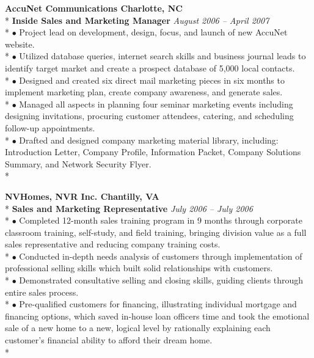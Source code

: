 \documentclass{article}
\begin{document}
\begin{samepage}
\noindent \textbf{AccuNet Communications \hfill Charlotte, NC} \\*
\textbf{Inside Sales and Marketing Manager} \hfill \textit{August 2006 -- April 2007} \\*
\noindent $\bullet$ Project lead on development, design, focus, and launch of new AccuNet website. \\*
\noindent $\bullet$ Utilized database queries, internet search skills and business journal leads to identify target market and create a prospect database of 5,000 local contacts. \\*
\noindent $\bullet$ Designed and created six direct mail marketing pieces in six months to implement marketing plan, create company awareness, and generate sales. \\*
\noindent $\bullet$ Managed all aspects in planning four seminar marketing events including designing invitations, procuring customer attendees, catering, and scheduling follow-up appointments. \\*
\noindent $\bullet$ Drafted and designed company marketing material library, including: Introduction Letter, Company Profile, Information Packet, Company Solutions Summary, and Network Security Flyer. \\*
\end{samepage}


\begin{samepage}
\noindent \textbf{NVHomes, NVR Inc. \hfill Chantilly, VA} \\*
\textbf{Sales and Marketing Representative} \hfill \textit{July 2006 -- July 2006} \\*
\noindent $\bullet$ Completed 12-month sales training program in 9 months through corporate classroom training, self-study, and field training, bringing division value as a full sales representative and reducing company training costs. \\*
\noindent $\bullet$ Conducted in-depth needs analysis of customers through implementation of professional selling skills which built solid relationships with customers. \\*
\noindent $\bullet$  Demonstrated consultative selling and closing skills, guiding clients through entire sales process.\\*
\noindent $\bullet$  Pre-qualified customers for financing, illustrating individual mortgage and financing options, which saved in-house loan officers time and took the emotional sale of a new home to a new, logical level by rationally explaining each customer’s financial ability to afford their dream home.\\*
\end{samepage}
\end{document}
